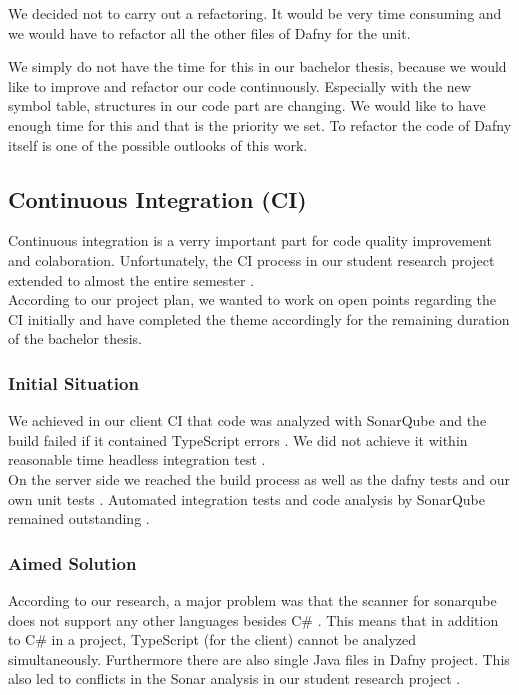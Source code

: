 We decided not to carry out a refactoring.
It would be very time consuming and we would have to refactor all the other files of Dafny for the unit.

We simply do not have the time for this in our bachelor thesis,
because we would like to improve and refactor our code continuously.
Especially with the new symbol table, structures in our code part are changing.
We would like to have enough time for this and that is the priority we set.
To refactor the code of Dafny itself is one of the possible outlooks of this work.



\subsection{Continuous Integration (CI)}
Continuous integration is a verry important part for code quality improvement and colaboration.
Unfortunately, the CI process in our student research project extended to almost the entire semester \cite{sa}. \\

According to our project plan, we wanted to work on open points regarding the CI initially and have completed the theme accordingly for the remaining duration of the bachelor thesis.

\subsubsection{Initial Situation}
We achieved in our client CI that code was analyzed with SonarQube and the build failed if it contained TypeScript errors \cite{sa}.
We did not achieve it within reasonable time headless integration test \cite{sa}. \\

On the server side we reached the build process as well as the dafny tests and our own unit tests \cite{sa}.
Automated integration tests and code analysis by SonarQube remained outstanding \cite{sa}.

\subsubsection{Aimed Solution}
According to our research, a major problem was that the scanner for sonarqube does not support any other languages besides C\# \cite{sonar-supports-only-one-language}.
This means that in addition to C\# in a project, TypeScript (for the client) cannot be analyzed simultaneously.
Furthermore there are also single Java files in Dafny project.
This also led to conflicts in the Sonar analysis in our student research project \cite{sa}. \\

